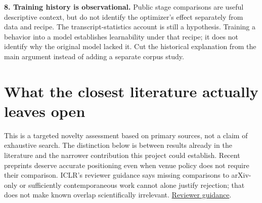 \documentclass[11pt]{article}
\newcommand{\source}[2]{\href{#1}{#2}}
\begin{document}
\textbf{8. Training history is observational.} Public stage comparisons are useful descriptive context, but do not identify the optimizer's effect separately from data and recipe. The transcript-statistics account is still a hypothesis. Training a behavior into a model establishes learnability under that recipe; it does not identify why the original model lacked it. Cut the historical explanation from the main argument instead of adding a separate corpus study.


\section{What the closest literature actually leaves open}

This is a targeted novelty assessment based on primary sources, not a claim of exhaustive search. The distinction below is between results already in the literature and the narrower contribution this project could establish. Recent preprints deserve accurate positioning even when venue policy does not require their comparison. ICLR's reviewer guidance says missing comparisons to arXiv-only or sufficiently contemporaneous work cannot alone justify rejection; that does not make known overlap scientifically irrelevant. \source{https://iclr.cc/Conferences/2027/ReviewerGuidelines}{Reviewer guidance}.
\end{document}
